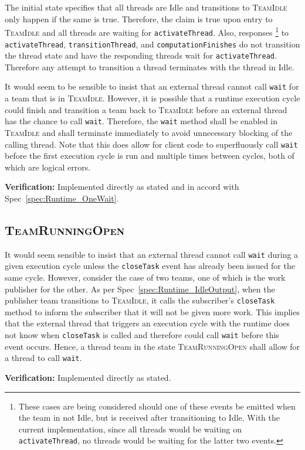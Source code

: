 \documentclass{article}
\newcommand{\TeamIdle}          {\textsc{TeamIdle}}
\newcommand{\TeamRunningOpen}   {\textsc{TeamRunningOpen}}
\begin{document}
The initial state specifies that all threads are Idle and transitions to
{\TeamIdle} only happen if the same is true.  Therefore, the claim is true upon
entry to {\TeamIdle} and all threads are waiting for \texttt{activateThread}.
Also, responses
\footnote{These cases are being considered should one of these
events be emitted when the team in not Idle, but is received after transitioning
to Idle.  With the current implementation, since all threads would be waiting on
\texttt{activateThread}, no threads would be waiting for the latter two events.}
to \texttt{activateThread}, \texttt{transitionThread}, and
\texttt{computationFinishes} do not transition the thread state and have the
responding threads wait for \texttt{activateThread}.  Therefore any attempt to
transition a thread terminates with the thread in Idle.

\begin{spec}
It would seem to be sensible to insist that an external thread cannot call
\texttt{wait} for a team that is in \TeamIdle.  However, it is possible that a
runtime execution cycle could finish and transition a team back to {\TeamIdle}
before an external thread has the chance to call \texttt{wait}.  Therefore, the
\texttt{wait} method shall be enabled in {\TeamIdle} and shall terminate immediately to avoid
unnecessary blocking of the calling thread.  Note that this does allow for
client code to superfluously call \texttt{wait} before the first execution cycle
is run and multiple times between cycles, both of which are logical errors.
\end{spec}
\textbf{Verification:}\hspace{0.125in}  Implemented directly as stated and in
accord with Spec~\ref{spec:Runtime_OneWait}.  

\subsection{\TeamRunningOpen}
\begin{spec}
It  would seem sensible to insist that an external thread cannot call
\texttt{wait} during a given execution cycle unless the \texttt{closeTask} event
has already been issued for the same cycle.  However, consider the case of two
teams, one of which is the work publisher for the other.  As per
Spec~\ref{spec:Runtime_IdleOutput}, when the publisher team transitions to
{\TeamIdle}, it calls the subscriber's \texttt{closeTask} method to inform the
subscriber that it will not be given more work.  This implies that the external
thread that triggers an execution cycle with the runtime does not know when
\texttt{closeTask} is called and therefore could call \texttt{wait} before this
event occurs.  Hence, a thread team in the state {\TeamRunningOpen} shall allow
for a thread to call \texttt{wait}.
\end{spec}
\textbf{Verification:}\hspace{0.125in}  Implemented directly as stated.
\end{document}
